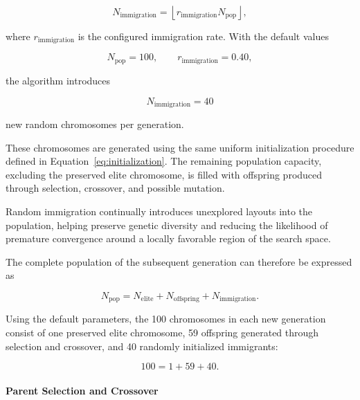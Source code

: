\documentclass[11pt]{article}
\begin{document}
\begin{equation}
    N_{\mathrm{immigration}}
    =
    \left\lfloor
        r_{\mathrm{immigration}}
        N_{\mathrm{pop}}
    \right\rfloor,
    \label{eq:num-immigrants}
\end{equation}

where $r_{\mathrm{immigration}}$ is the configured immigration rate. With the default values

\begin{equation}
    N_{\mathrm{pop}} = 100,
    \qquad
    r_{\mathrm{immigration}} = 0.40,
\end{equation}

the algorithm introduces

\begin{equation}
    N_{\mathrm{immigration}} = 40
\end{equation}

new random chromosomes per generation.

These chromosomes are generated using the same uniform initialization procedure defined in Equation~\ref{eq:initialization}. The remaining population capacity, excluding the preserved elite chromosome, is filled with offspring produced through selection, crossover, and possible mutation.

Random immigration continually introduces unexplored layouts into the population, helping preserve genetic diversity and reducing the likelihood of premature convergence around a locally favorable region of the search space.

The complete population of the subsequent generation can therefore be expressed as

\begin{equation}
    N_{\mathrm{pop}}
    =
    N_{\mathrm{elite}}
    +
    N_{\mathrm{offspring}}
    +
    N_{\mathrm{immigration}}.
    \label{eq:population-composition}
\end{equation}

Using the default parameters, the 100 chromosomes in each new generation consist of one preserved elite chromosome, 59 offspring generated through selection and crossover, and 40 randomly initialized immigrants:

\begin{equation}
    100 = 1 + 59 + 40.
\end{equation}

\paragraph{Parent Selection and Crossover}
\end{document}
